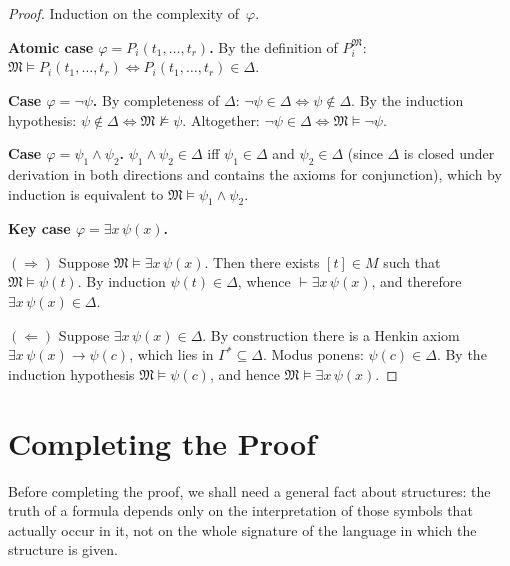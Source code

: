 \documentclass[12pt, a4paper]{article}
\theoremstyle{plain}
\theoremstyle{definition}
\newcommand{\proves}{\vdash}
\renewcommand{\models}{\vDash}
\newcommand{\Struct}{\mathfrak{M}}
\begin{document}
\begin{proof}
Induction on the complexity of~$\varphi$.

\medskip
\noindent\textbf{Atomic case $\varphi = P_i(t_1,\ldots,t_r)$.}
By the definition of $P_i^{\Struct}$:
$\Struct \models P_i(t_1,\ldots,t_r) \iff P_i(t_1,\ldots,t_r) \in \Delta$.

\medskip
\noindent\textbf{Case $\varphi = \neg\psi$.}
By completeness of $\Delta$: $\neg\psi \in \Delta \iff \psi \notin \Delta$.
By the induction hypothesis: $\psi \notin \Delta \iff \Struct \not\models \psi$.
Altogether: $\neg\psi \in \Delta \iff \Struct \models \neg\psi$. \checkmark

\medskip
\noindent\textbf{Case $\varphi = \psi_1 \wedge \psi_2$.}
$\psi_1 \wedge \psi_2 \in \Delta$ iff $\psi_1 \in \Delta$ and $\psi_2 \in \Delta$
(since $\Delta$ is closed under derivation in both directions
and contains the axioms for conjunction),
which by induction is equivalent to $\Struct \models \psi_1 \wedge \psi_2$. \checkmark

\medskip
\noindent\textbf{Key case $\varphi = \exists x\,\psi(x)$.}

$(\Rightarrow)$ Suppose $\Struct \models \exists x\,\psi(x)$.
Then there exists $[t] \in M$ such that $\Struct \models \psi(t)$.
By induction $\psi(t) \in \Delta$, whence $\proves \exists x\,\psi(x)$,
and therefore $\exists x\,\psi(x) \in \Delta$.

$(\Leftarrow)$ Suppose $\exists x\,\psi(x) \in \Delta$.
By construction there is a Henkin axiom
$\exists x\,\psi(x) \to \psi(c)$, which lies in $\Gamma^* \subseteq \Delta$.
Modus ponens: $\psi(c) \in \Delta$.
By the induction hypothesis $\Struct \models \psi(c)$,
and hence $\Struct \models \exists x\,\psi(x)$. \checkmark
\end{proof}

\section{Completing the Proof}

Before completing the proof, we shall need a general fact about
structures: the truth of a formula depends only on the interpretation of those
symbols that actually occur in it, not on the whole signature of the language
in which the structure is given.
\end{document}
